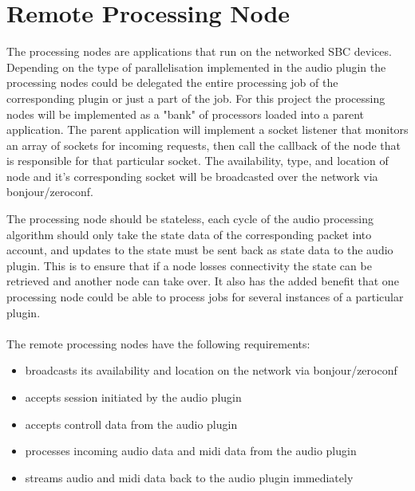 \section{Remote Processing Node}

The processing nodes are applications that run on the networked SBC devices. Depending on the type of parallelisation implemented in the audio plugin the processing nodes could be delegated the entire processing job of the corresponding plugin or just a part of the job. For this project the processing nodes will be implemented as a "bank" of processors loaded into a parent application. The parent application will implement a socket listener that monitors an array of sockets for incoming requests, then call the callback of the node that is responsible for that particular socket. The availability, type, and location of node and it's corresponding socket will be broadcasted over the network via bonjour/zeroconf.

The processing node should be stateless, each cycle of the audio processing algorithm should only take the state data of the corresponding packet into account, and updates to the state must be sent back as state data to the audio plugin. This is to ensure that if a node losses connectivity the state can be retrieved and another node can take over. It also has the added benefit that one processing node could be able to process jobs for several instances of a particular plugin.\\
\\
\noindent
The remote processing nodes have the following requirements:

\begin{itemize}

\item broadcasts its availability and location on the network via bonjour/zeroconf
\item accepts session initiated by the audio plugin
\item accepts controll data from the audio plugin
\item processes incoming audio data and midi data from the audio plugin
\item streams audio and midi data back to the audio plugin immediately

\end{itemize}
